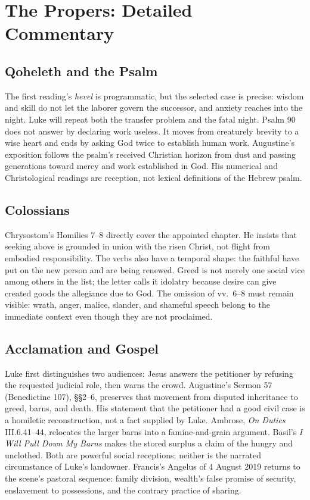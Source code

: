 \section*{The Propers: Detailed Commentary}
\subsection*{Qoheleth and the Psalm}
The first reading's \emph{hevel} is programmatic, but the selected case is
precise: wisdom and skill do not let the laborer govern the successor, and
anxiety reaches into the night. Luke will repeat both the transfer problem and
the fatal night. Psalm 90 does not answer by declaring work useless. It moves
from creaturely brevity to a wise heart and ends by asking God twice to
establish human work. Augustine's exposition follows the psalm's received
Christian horizon from dust and passing generations toward mercy and work
established in God. His numerical and Christological readings are reception,
not lexical definitions of the Hebrew psalm.
\subsection*{Colossians}
Chrysostom's Homilies 7--8 directly cover the appointed chapter. He insists
that seeking above is grounded in union with the risen Christ, not flight from
embodied responsibility. The verbs also have a temporal shape: the faithful
have put on the new person and are being renewed. Greed is not merely one
social vice among others in the list; the letter calls it idolatry because
desire can give created goods the allegiance due to God. The omission of
vv.~6--8 must remain visible: wrath, anger, malice, slander, and shameful
speech belong to the immediate context even though they are not proclaimed.
\subsection*{Acclamation and Gospel}
Luke first distinguishes two audiences: Jesus answers the petitioner by
refusing the requested judicial role, then warns the crowd. Augustine's
Sermon 57 (Benedictine 107), §§2--6, preserves that movement from disputed
inheritance to greed, barns, and death. His statement that the petitioner had
a good civil case is a homiletic reconstruction, not a fact supplied by Luke.
Ambrose, \emph{On Duties} III.6.41--44, relocates the larger barns into a
famine-and-grain argument. Basil's \emph{I Will Pull Down My Barns} makes the
stored surplus a claim of the hungry and unclothed. Both are powerful social
receptions; neither is the narrated circumstance of Luke's landowner.
Francis's Angelus of 4 August 2019 returns to the scene's pastoral sequence:
family division, wealth's false promise of security, enslavement to
possessions, and the contrary practice of sharing.
